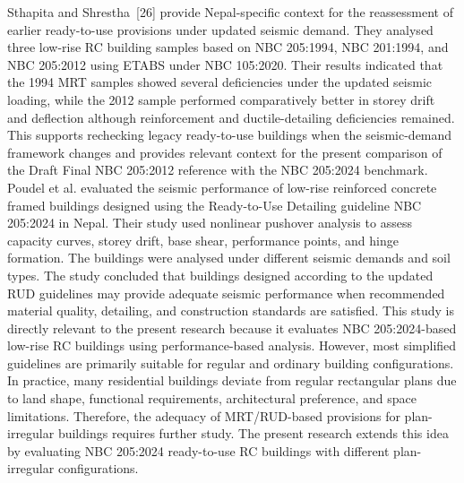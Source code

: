 Sthapita and Shrestha~[26] provide Nepal-specific context for the reassessment of earlier ready-to-use provisions under updated seismic demand. They analysed three low-rise RC building samples based on NBC 205:1994, NBC 201:1994, and NBC 205:2012 using ETABS under NBC 105:2020. Their results indicated that the 1994 MRT samples showed several deficiencies under the updated seismic loading, while the 2012 sample performed comparatively better in storey drift and deflection although reinforcement and ductile-detailing deficiencies remained. This supports rechecking legacy ready-to-use buildings when the seismic-demand framework changes and provides relevant context for the present comparison of the Draft Final NBC 205:2012 reference with the NBC 205:2024 benchmark.
Poudel et al. \cite{poudel2025seismic} evaluated the seismic performance of low-rise reinforced concrete framed buildings designed using the Ready-to-Use Detailing guideline NBC 205:2024 in Nepal. Their study used nonlinear pushover analysis to assess capacity curves, storey drift, base shear, performance points, and hinge formation. The buildings were analysed under different seismic demands and soil types. The study concluded that buildings designed according to the updated RUD guidelines may provide adequate seismic performance when recommended material quality, detailing, and construction standards are satisfied. This study is directly relevant to the present research because it evaluates NBC 205:2024-based low-rise RC buildings using performance-based analysis.
However, most simplified guidelines are primarily suitable for regular and ordinary building configurations. In practice, many residential buildings deviate from regular rectangular plans due to land shape, functional requirements, architectural preference, and space limitations. Therefore, the adequacy of MRT/RUD-based provisions for plan-irregular buildings requires further study. The present research extends this idea by evaluating NBC 205:2024 ready-to-use RC buildings with different plan-irregular configurations.

